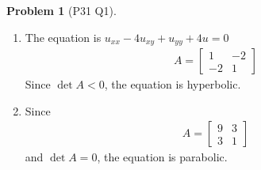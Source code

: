 \documentclass[twoside,11pt]{article}
\theoremstyle{definition}
\newtheorem{problem}{Problem}
\theoremstyle{remark}
\begin{document}
\begin{problem}[P31 Q1]\
    \begin{enumerate}[label=(\alph*)]
        \item The equation is $u_{xx} -4u_{xy} + u_{yy} + 4u = 0$
        \begin{align*}
            A = \begin{bmatrix}
                1 & -2\\
                -2 & 1
            \end{bmatrix}
        \end{align*}
        Since $\det A < 0$, the equation is hyperbolic.

        \item Since
        \begin{align*}
            A = \begin{bmatrix}
                9 & 3\\
                3 & 1
            \end{bmatrix}
        \end{align*}
        and $\det A = 0$, the equation is parabolic.
    \end{enumerate}
\end{problem}

\end{document}
